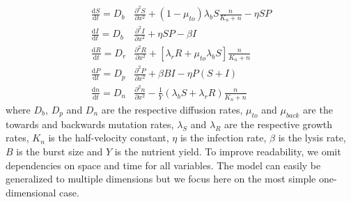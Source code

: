 \begin{align}
    \frac{\text{d}S}{\text{d}t} = D_b &\frac{\partial^2S}{\partial x^2} + \left( 1 - \mu_{to} \right) \lambda_b S \frac{n}{K_n+n}  - \eta SP \\
    \frac{\text{d}I}{\text{d}t} = D_b &\frac{\partial^2I}{\partial x^2} + \eta SP - \beta I\\
    \frac{\text{d}R}{\text{d}t} = D_r &\frac{\partial^2R}{\partial x^2} + \left[\lambda_r R + \mu_{to} \lambda_b S \right] \frac{n}{K_n+n}\\
    \frac{\text{d}P}{\text{d}t} = D_p &\frac{\partial^2P}{\partial x^2} + \beta BI - \eta P(S+I) \\
    \frac{\text{d}n}{\text{d}t} = D_n &\frac{\partial^2n}{\partial x^2} - \frac{1}{Y} \left( \lambda_b S + \lambda_r R \right) \frac{n}{K_n+n}
\end{align}
where $D_b$, $D_p$ and $D_n$ are the respective diffusion rates, $\mu_{to}$ and $\mu_{back}$ are the towards and backwards mutation rates, $\lambda_S$ and $\lambda_R$ are the respective growth rates, $K_n$ is the half-velocity constant, $\eta$ is the infection rate, $\beta$ is the lysis rate, $B$ is the burst size and $Y$ is the nutrient yield. To improve readability, we omit dependencies on space and time for all variables. The model can easily be generalized to multiple dimensions but we focus here on the most simple one-dimensional case.


